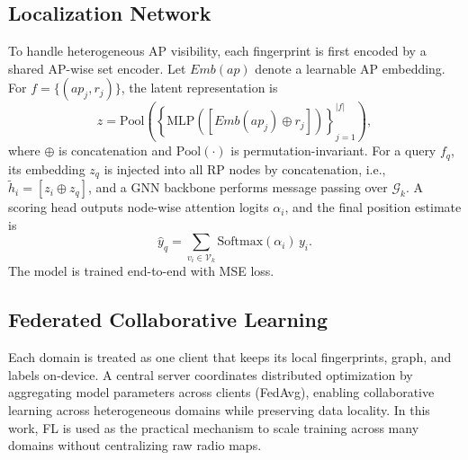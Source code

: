 \documentclass[conference]{IEEEtran}
\begin{document}
\subsection{Localization Network}
To handle heterogeneous AP visibility, each fingerprint is first encoded by a shared AP-wise set encoder. Let $Emb(ap)$ denote a learnable AP embedding. For $f=\{(ap_j,r_j)\}$, the latent representation is
\begin{equation}
z=\mathrm{Pool}\!\left(\left\{\mathrm{MLP}([Emb(ap_j)\oplus r_j])\right\}_{j=1}^{|f|}\right),
\end{equation}
where $\oplus$ is concatenation and $\mathrm{Pool}(\cdot)$ is permutation-invariant. For a query $f_q$, its embedding $z_q$ is injected into all RP nodes by concatenation, i.e., $\tilde h_i=[z_i\oplus z_q]$, and a GNN backbone performs message passing over $\mathcal{G}_k$. A scoring head outputs node-wise attention logits $\alpha_i$, and the final position estimate is
\begin{equation}
\hat y_q=\sum_{v_i\in\mathcal{V}_k}\mathrm{Softmax}(\alpha_i)\,y_i.
\end{equation}
The model is trained end-to-end with MSE loss.

\subsection{Federated Collaborative Learning}
Each domain is treated as one client that keeps its local fingerprints, graph, and labels on-device. A central server coordinates distributed optimization by aggregating model parameters across clients (FedAvg), enabling collaborative learning across heterogeneous domains while preserving data locality. In this work, FL is used as the practical mechanism to scale training across many domains without centralizing raw radio maps.
\end{document}
